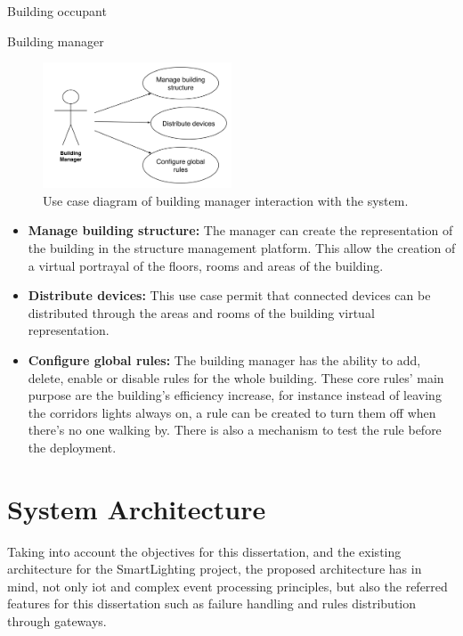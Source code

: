 \begin{Paragraph}{Building occupant}
\begin{itemize}
\end{itemize}
\end{Paragraph}


\begin{Paragraph}{Building manager}
	
	
	\begin{figure}[H]
		\centering
		\includegraphics[width=0.5\textwidth]{figures/usecase2.png}
		\caption{Use case diagram of building manager interaction with the system.}
		\label{fig:manager}
	\end{figure}
\begin{itemize}
	\item{\textbf{Manage building structure:}	The manager can create the representation of the building in the structure management platform. This allow the creation of a virtual portrayal of the floors, rooms and areas of the building.}
	\item{\textbf{Distribute devices:}	This use case permit that connected devices can be distributed through the areas and rooms of the building virtual representation.}
	\item{\textbf{Configure global rules:}	The building manager has the ability to add, delete, enable or disable rules for the whole building. These core rules' main purpose are the building's efficiency increase, for instance instead of leaving the corridors lights always on, a rule can be created to turn them off when there's no one walking by. There is also a mechanism to test the rule before the deployment.}
\end{itemize}
\end{Paragraph}


\section{System Architecture}
\label{Architecture:Architecture}


Taking into account the objectives for this dissertation, and the existing architecture for the SmartLighting project, the proposed architecture has in mind, not only \ac{iot} and complex event processing principles, but also the referred features for this dissertation such as failure handling and rules distribution through gateways.

